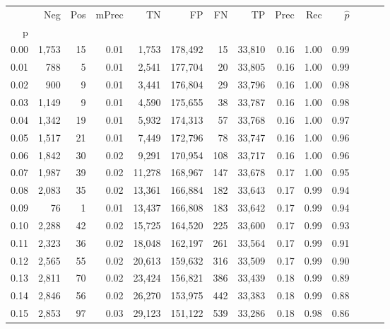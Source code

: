 \begin{tabular}{rrrrrrrrrrrrrr}
\toprule
{} &    Neg &  Pos & mPrec &       TN &       FP &      FN &      TP &  Prec &   Rec & $\hat{p}$ \\
p    &        &      &       &          &          &         &         &       &       &           \\
\midrule
0.00 &  1,753 &   15 &  0.01 &    1,753 &  178,492 &      15 &  33,810 &  0.16 &  1.00 &      0.99 \\
0.01 &    788 &    5 &  0.01 &    2,541 &  177,704 &      20 &  33,805 &  0.16 &  1.00 &      0.99 \\
0.02 &    900 &    9 &  0.01 &    3,441 &  176,804 &      29 &  33,796 &  0.16 &  1.00 &      0.98 \\
0.03 &  1,149 &    9 &  0.01 &    4,590 &  175,655 &      38 &  33,787 &  0.16 &  1.00 &      0.98 \\
0.04 &  1,342 &   19 &  0.01 &    5,932 &  174,313 &      57 &  33,768 &  0.16 &  1.00 &      0.97 \\
0.05 &  1,517 &   21 &  0.01 &    7,449 &  172,796 &      78 &  33,747 &  0.16 &  1.00 &      0.96 \\
0.06 &  1,842 &   30 &  0.02 &    9,291 &  170,954 &     108 &  33,717 &  0.16 &  1.00 &      0.96 \\
0.07 &  1,987 &   39 &  0.02 &   11,278 &  168,967 &     147 &  33,678 &  0.17 &  1.00 &      0.95 \\
0.08 &  2,083 &   35 &  0.02 &   13,361 &  166,884 &     182 &  33,643 &  0.17 &  0.99 &      0.94 \\
0.09 &     76 &    1 &  0.01 &   13,437 &  166,808 &     183 &  33,642 &  0.17 &  0.99 &      0.94 \\
0.10 &  2,288 &   42 &  0.02 &   15,725 &  164,520 &     225 &  33,600 &  0.17 &  0.99 &      0.93 \\
0.11 &  2,323 &   36 &  0.02 &   18,048 &  162,197 &     261 &  33,564 &  0.17 &  0.99 &      0.91 \\
0.12 &  2,565 &   55 &  0.02 &   20,613 &  159,632 &     316 &  33,509 &  0.17 &  0.99 &      0.90 \\
0.13 &  2,811 &   70 &  0.02 &   23,424 &  156,821 &     386 &  33,439 &  0.18 &  0.99 &      0.89 \\
0.14 &  2,846 &   56 &  0.02 &   26,270 &  153,975 &     442 &  33,383 &  0.18 &  0.99 &      0.88 \\
0.15 &  2,853 &   97 &  0.03 &   29,123 &  151,122 &     539 &  33,286 &  0.18 &  0.98 &      0.86 \\

\end{tabular}
